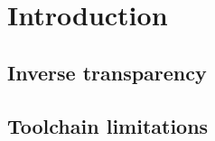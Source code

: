 \documentclass[../main.tex]{subfiles}
\begin{document}
\chapter{Introduction}

\section{Inverse transparency}

\section{Toolchain limitations}
\end{document}
